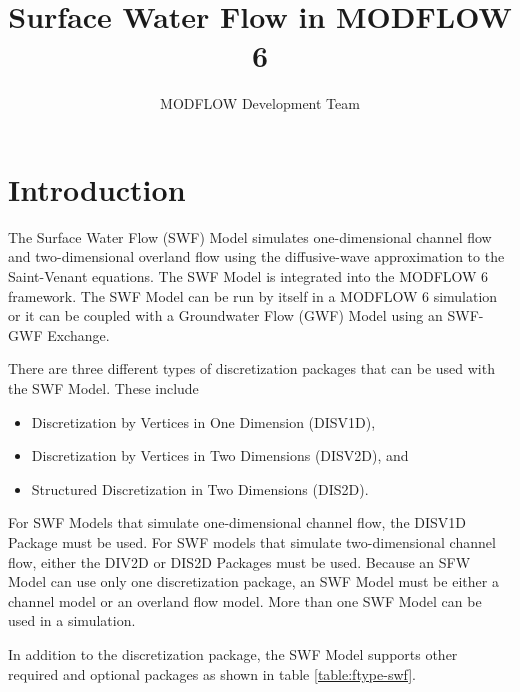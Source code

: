 \documentclass[fleqn]{article}
\author{MODFLOW Development Team}
\begin{document}
\title{Surface Water Flow in MODFLOW 6}
\maketitle

\tableofcontents

\section{Introduction}
The Surface Water Flow (SWF) Model simulates one-dimensional channel flow and two-dimensional overland flow using the diffusive-wave approximation to the Saint-Venant equations.  The SWF Model is integrated into the MODFLOW 6 framework.  The SWF Model can be run by itself in a MODFLOW 6 simulation or it can be coupled with a Groundwater Flow (GWF) Model using an SWF-GWF Exchange.

There are three different types of discretization packages that can be used with the SWF Model.  These include 

\begin{itemize}
  \item Discretization by Vertices in One Dimension (DISV1D), 
  \item Discretization by Vertices in Two Dimensions (DISV2D), and
  \item Structured Discretization in Two Dimensions (DIS2D).
\end{itemize}

\noindent For SWF Models that simulate one-dimensional channel flow, the DISV1D Package must be used.  For SWF models that simulate two-dimensional channel flow, either the DIV2D or DIS2D Packages must be used.  Because an SFW Model can use only one discretization package, an SWF Model must be either a channel model or an overland flow model.  More than one SWF Model can be used in a simulation.

In addition to the discretization package, the SWF Model supports other required and optional packages as shown in table \ref{table:ftype-swf}.
\end{document}
